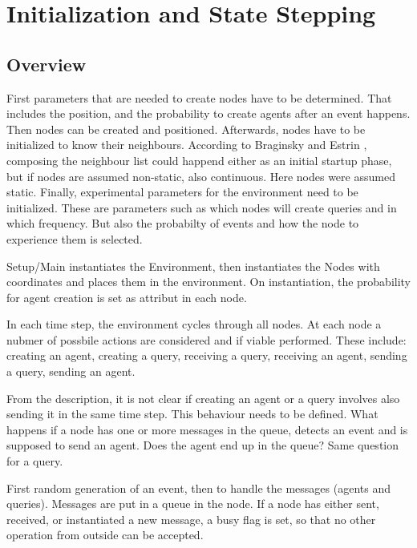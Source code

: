 \documentclass[a4paper,11pt,twoside]{article}
\begin{document}
\section{Initialization and State Stepping}
\subsection{Overview}
First parameters that are needed to create nodes have to be determined.
That includes the position, and the probability to create agents after
an event happens. Then nodes can be created and
positioned. Afterwards, nodes have to be initialized to know their
neighbours. According to Braginsky and Estrin \cite{braginsky2002},
composing the neighbour list could happend either as an initial
startup phase, but if nodes are assumed non-static, also
continuous. Here nodes were assumed static. Finally, experimental
parameters for the environment need to be initialized. These are
parameters such as which nodes will create queries and in which
frequency. But also the probabilty of events and how the node to
experience them is selected. 

Setup/Main instantiates the Environment, then instantiates the Nodes
with coordinates and places them in the environment. On
instantiation, the probability for agent creation is set as attribut
in each node.

In each time step, the environment cycles through all
nodes. At each node a nubmer of possbile actions are considered and if
viable performed. These include: creating an agent, creating a query,
receiving a query, receiving an agent, sending a query, sending an
agent.

From the description, it is not clear if creating an agent or a query
involves also sending it in the same time step. This behaviour needs
to be defined. What happens if a node has one or more messages in the
queue, detects an event and is supposed to send an agent. Does the
agent end up in the queue? Same question for a query.

First random generation of an event, then to handle the messages
(agents and queries). Messages are put in a queue in the node. If
a node has either sent, received, or instantiated a new message, a
busy flag is set, so that no other operation from outside
can be accepted.   
\end{document}
